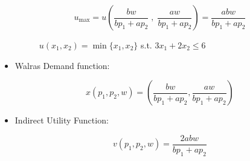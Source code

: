 \documentclass[
12pt, %
a4paper, %
onecolumn, %
portrait %
]{article}
\begin{document}
\begin{itemize}
	\[
	u_{\max}=u\left(\frac{bw}{bp_1+ap_2}\;,\;\frac{aw}{bp_1+ap_2}\right)=\frac{abw}{bp_1+ap_2}
	\]
	\begin{figure}[H]
		\centering
		\caption{$u(x_1,x_2)=\min\{x_1,x_2\}$ s.t. $3x_1+2x_2\le 6$}
		\label{Fig.lable}
	\end{figure}
	
	
	


\item Walras Demand function:

\begin{equation*}
x(p_1,p_2,w)=
\left(\frac{bw}{bp_1+ap_2},\frac{aw}{bp_1+ap_2}\right)
\end{equation*}


\item Indirect Utility Function:

\begin{equation*}
v(p_1,p_2,w)=\frac{2abw}{bp_1+ap_2}
\end{equation*}
	
\end{itemize}
\end{document}
